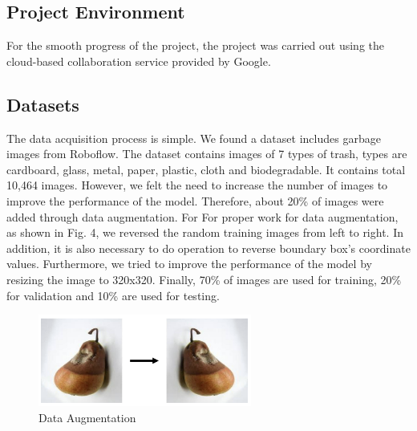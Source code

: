 \documentclass{article}
\begin{document}
{\subsection{Project Environment}
{For the smooth progress of the project, the project was carried out using the cloud-based collaboration service provided by Google.}
\\
\subsection{Datasets}
{The data acquisition process is simple. We found a dataset
includes garbage images from Roboflow.\cite{garbage-classification-3_dataset} The dataset contains
images of 7 types of trash, types are cardboard, glass, metal, paper, plastic, cloth and biodegradable. It contains total 10,464 images. However, we felt the need to increase the number of images to improve the performance of the model. Therefore, about 20\% of images were added through data augmentation. For For proper work for data augmentation, as shown in Fig. 4, we reversed the random training images from left to right. In addition, it is also necessary to do operation to reverse boundary box's coordinate values. Furthermore, we tried to improve the performance of the model by resizing the image to 320x320. Finally, 70\% of images are used for training, 20\% for validation and 10\% are used for testing. }\\
\begin{figure}[!htb]
    \centering
    \includegraphics[width=7cm]{Final_Project/image/reversed data.png}
    \caption{Data Augmentation}
    \label{fig:my_label}
\end{figure}
}
\end{document}

